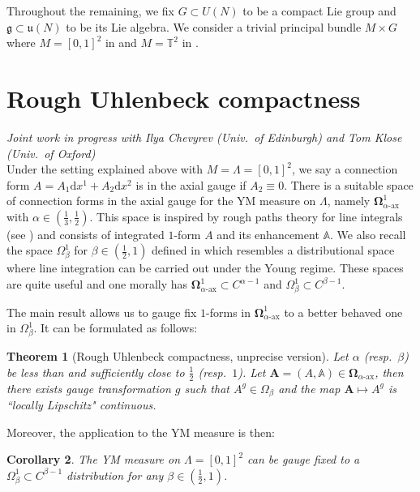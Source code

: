 \documentclass[12pt]{article}
\numberwithin{equation}{section}
\newtheorem{theorem}{Theorem}[section]
\newtheorem{corollary}[theorem]{Corollary}
\theoremstyle{definition}
\theoremstyle{remark}
\newcommand{\diff}{\mathrm{d}}
\newcommand{\1}{\mathbf 1}
\newcommand{\<}{\langle}
\renewcommand{\>}{\rangle}
\newcommand{\ax}{\text{-}\mathrm{ax}}
\newcommand{\bfA}{\mathbf A}
\newcommand{\bA}{\mathbb A}
\newcommand{\bfOmega}{\boldsymbol{\Omega}}
\newcommand{\fg}{\mathfrak g}
\newcommand{\fu}{\mathfrak u}
\newcommand{\bT}{\mathbb T}
\begin{document}
%
Throughout the remaining, we fix  $G\subset U(N)$ to be a compact Lie group and $\fg\subset \fu(N)$ to be its Lie algebra. We consider a trivial principal bundle $M\times G$ where $M=[0,1]^2$ in  and $M=\bT^2$ in .  




\section{Rough Uhlenbeck compactness}\label{sec:RUC}
\vspace{-7pt}\textit{{\footnotesize Joint work in progress with Ilya Chevyrev (Univ.\ of Edinburgh) and Tom Klose (Univ.\  of Oxford)}}\\

\noindent \vspace{-2pt}Under the setting explained above with $M=\Lambda=[0,1]^2$, we say a connection form $A=A_1\diff x^1+A_2\diff x^2$ is in the axial gauge if $A_2\equiv 0$. There is a suitable space of connection forms in the axial gauge for the YM measure on $\Lambda$, namely $\bfOmega_{\alpha\ax}^1$ with $\alpha\in (\frac 1 3,\frac 1 2)$. This space is inspired by rough paths theory for line integrals (see ) and consists of integrated $1$-form $A$ and its enhancement $\bA$. We also recall the space $\Omega_\beta^1$ for $\beta\in (\frac 1 2,1)$ defined in \cite{CCHS2d} which resembles a distributional space where line integration can be carried out under the Young regime. These spaces are quite useful and one morally has $\bfOmega_{\alpha\ax}^1\subset C^{\alpha-1}$ and $\Omega_\beta^1\subset C^{\beta-1}$. 


The main result allows us to gauge fix $1$-forms in $\bfOmega_{\alpha\ax}^1$ to a better behaved one in $\Omega_\beta^1$. It can be formulated as follows: 
\begin{theorem}[Rough Uhlenbeck compactness, unprecise version]\label{thm:RUC} Let $\alpha$ (resp.\ $\beta$) be less than and sufficiently close to $\frac 12$ (resp.\ $1$). Let $\bfA=(A,\bA)\in \bfOmega_{\alpha\ax}$, then there exists gauge transformation $g$ such that $A^g\in \Omega_\beta$ and the map $\bfA\mapsto A^g$ is ``locally Lipschitz" continuous.   
\end{theorem}

 Moreover, the application to the YM measure is then:
\begin{corollary}
    The YM measure on $\Lambda=[0,1]^2$ can be gauge fixed to a $\Omega_\beta^1\subset C^{\beta-1}$ distribution for any $\beta\in (\frac 1 2 ,1)$. 
\end{corollary}
\end{document}

